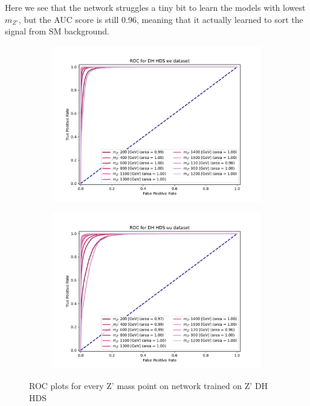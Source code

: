 \documentclass[12pt, a4paper]{book}
\begin{document}
Here we see that the network struggles a tiny bit to learn the models with lowest $m_{Z'}$, but the AUC score is still 0.96, meaning that it actually learned to sort the signal from SM background.\\
\begin{figure}[!ht]
	\centering
	\begin{subfigure}[b]{0.49\textwidth}
      \centering
      \includegraphics[width=1\textwidth]{XGBoost/DH_HDS/ROC_ee.pdf}
      \end{subfigure}
   \hfill
   \begin{subfigure}[b]{0.49\textwidth}
      \centering
      \includegraphics[width=1\textwidth]{XGBoost/DH_HDS/ROC_uu.pdf}
      \end{subfigure}
   \caption{ROC plots for every Z' mass point on network trained on Z' DH HDS}\label{fig:DH_HDS_ROCS}
\end{figure}
\end{document}
